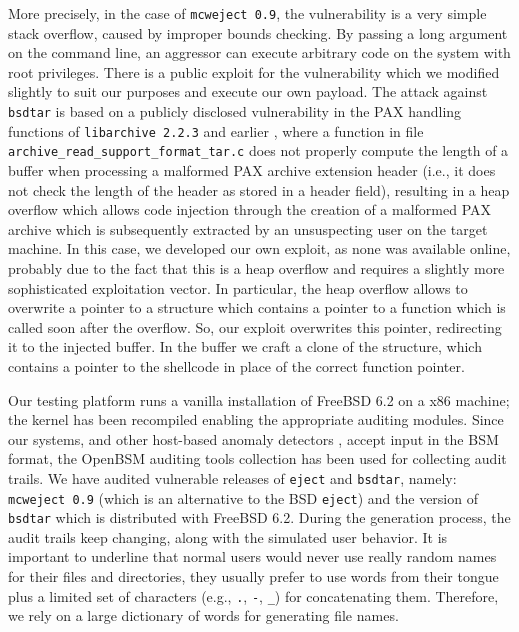 More precisely, in the case of \texttt{mcweject 0.9},
the vulnerability \citep{adv-eject} is a very simple stack overflow,
caused by improper bounds checking. By passing a long argument on the
command line, an aggressor can execute arbitrary code on the system
with root privileges. There is a public exploit for the vulnerability
\citep{exp-eject} which we modified slightly to suit our purposes and
execute our own payload. The attack against
\texttt{bsdtar} is based on a publicly disclosed
vulnerability in the PAX handling functions of \texttt{libarchive
  2.2.3} and earlier \citep{adv-libarchive}, where a function in file
\texttt{archive\_read\_support\_format\_tar.c} does not properly
compute the length of a buffer when processing a malformed PAX archive
extension header (i.e., it does not check the length of the header as
stored in a header field), resulting in a heap overflow which allows
code injection through the creation of a malformed PAX archive which
is subsequently extracted by an unsuspecting user on the target
machine. In this case, we developed our own exploit, as none was
available online, probably due to the fact that this is a heap
overflow and requires a slightly more sophisticated exploitation
vector. In particular, the heap overflow allows to overwrite a pointer
to a structure which contains a pointer to a function which is called
soon after the overflow. So, our exploit overwrites this pointer,
redirecting it to the injected buffer. In the buffer we craft a clone
of the structure, which contains a pointer to the
shellcode in place of the correct function pointer.

Our testing platform runs a vanilla installation of
\textsf{FreeBSD} 6.2 on a x86 machine; the kernel has
been recompiled enabling the appropriate auditing modules. Since our
systems, and other host-based anomaly detectors
\citep{libanomaly,mutz06:syscalls}, accept input in the \ac{BSM}
format, the \textsf{OpenBSM} \citep{openbsm} auditing tools collection
has been used for collecting audit trails. We have audited vulnerable
releases of \texttt{eject} and \texttt{bsdtar}, namely:
\texttt{mcweject 0.9} (which is an alternative to the
BSD \texttt{eject}) and the version of \texttt{bsdtar}
which is distributed with \textsf{FreeBSD} 6.2. During the generation
process, the audit trails keep changing, along with the simulated user
behavior. It is important to underline that normal users would never
use really random names for their files and directories, they usually
prefer to use words from their tongue plus a limited set of characters
(e.g., \texttt{.}, \texttt{-}, \texttt{\_}) for concatenating
them. Therefore, we rely on a large dictionary of words for generating
file names.

